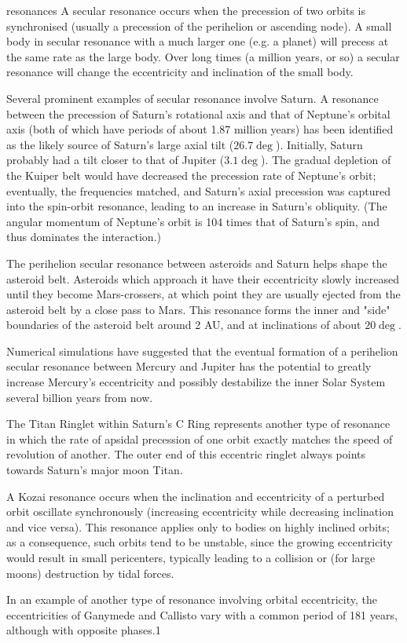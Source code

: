 \begin{frame}[allowframebreaks]{resonances}
A secular resonance occurs when the precession of two orbits is synchronised (usually a precession of the perihelion or ascending node). A small body in secular resonance with a much larger one (e.g. a planet) will precess at the same rate as the large body. Over long times (a million years, or so) a secular resonance will change the eccentricity and inclination of the small body.

Several prominent examples of secular resonance involve Saturn. A resonance between the precession of Saturn's rotational axis and that of Neptune's orbital axis (both of which have periods of about 1.87 million years) has been identified as the likely source of Saturn's large axial tilt ($26.7\deg$). Initially, Saturn probably had a tilt closer to that of Jupiter ($3.1\deg$). The gradual depletion of the Kuiper belt would have decreased the precession rate of Neptune's orbit; eventually, the frequencies matched, and Saturn's axial precession was captured into the spin-orbit resonance, leading to an increase in Saturn's obliquity. (The angular momentum of Neptune's orbit is 104 times that of Saturn's spin, and thus dominates the interaction.)

The perihelion secular resonance between asteroids and Saturn  helps shape the asteroid belt. Asteroids which approach it have their eccentricity slowly increased until they become Mars-crossers, at which point they are usually ejected from the asteroid belt by a close pass to Mars. This resonance forms the inner and "side" boundaries of the asteroid belt around 2 AU, and at inclinations of about $20\deg$.

Numerical simulations have suggested that the eventual formation of a perihelion secular resonance between Mercury and Jupiter has the potential to greatly increase Mercury's eccentricity and possibly destabilize the inner Solar System several billion years from now.

The Titan Ringlet within Saturn's C Ring represents another type of resonance in which the rate of apsidal precession of one orbit exactly matches the speed of revolution of another. The outer end of this eccentric ringlet always points towards Saturn's major moon Titan.

A Kozai resonance occurs when the inclination and eccentricity of a perturbed orbit oscillate synchronously (increasing eccentricity while decreasing inclination and vice versa). This resonance applies only to bodies on highly inclined orbits; as a consequence, such orbits tend to be unstable, since the growing eccentricity would result in small pericenters, typically leading to a collision or (for large moons) destruction by tidal forces.

In an example of another type of resonance involving orbital eccentricity, the eccentricities of Ganymede and Callisto vary with a common period of 181 years, although with opposite phases.1
\end{frame}


